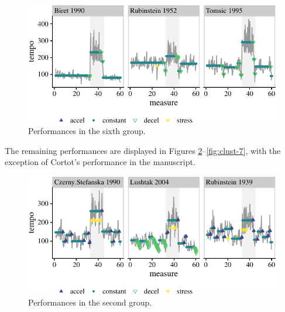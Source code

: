 \documentclass[aoas]{imsart}
\begin{document}
\begin{figure}

{\centering \includegraphics{gfx/clust-6-1} 

}

\caption{Performances in the sixth group.}\label{fig:clust-6}
\end{figure}

The remaining performances are displayed in Figures
\ref{fig:clust-2}--\ref{fig:clust-7}, with the exception of Cortot's
performance in the manuscript.

\begin{figure}

{\centering \includegraphics{gfx/clust-2-1} 

}

\caption{Performances in the second group.}\label{fig:clust-2}
\end{figure}
\end{document}
